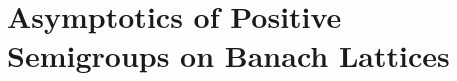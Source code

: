 \setcounter{chapter}{3}
\chapter{Asymptotics of Positive Semigroups on Banach Lattices}\label{chap:C-IV} %





%
%